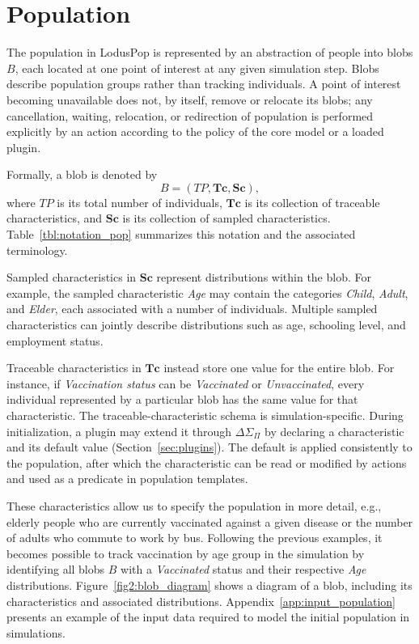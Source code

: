 \FloatBarrier

\section{Population}
\label{sec:population}

\begingroup\color{red}
The population in LodusPop is represented by an abstraction of people into blobs $B$, each located at one point of interest at any given simulation step. Blobs describe population groups rather than tracking individuals. A point of interest becoming unavailable does not, by itself, remove or relocate its blobs; any cancellation, waiting, relocation, or redirection of population is performed explicitly by an action according to the policy of the core model or a loaded plugin.

Formally, a blob is denoted by
\begin{equation}
B=(TP,\bm{Tc},\bm{Sc}),
\label{eq:blob_definition}
\end{equation}
where $TP$ is its total number of individuals, $\bm{Tc}$ is its collection of traceable characteristics, and $\bm{Sc}$ is its collection of sampled characteristics. Table~\ref{tbl:notation_pop} summarizes this notation and the associated terminology.

Sampled characteristics in $\bm{Sc}$ represent distributions within the blob. For example, the sampled characteristic \textit{Age} may contain the categories \textit{Child}, \textit{Adult}, and \textit{Elder}, each associated with a number of individuals. Multiple sampled characteristics can jointly describe distributions such as age, schooling level, and employment status.

Traceable characteristics in $\bm{Tc}$ instead store one value for the entire blob. For instance, if \textit{Vaccination status} can be \textit{Vaccinated} or \textit{Unvaccinated}, every individual represented by a particular blob has the same value for that characteristic. The traceable-characteristic schema is simulation-specific. 
During initialization, a plugin may extend it through $\Delta\Sigma_{\Pi}$ by declaring a characteristic and its default value (Section~\ref{sec:plugins}). The default is applied consistently to the population, after which the characteristic can be read or modified by actions and used as a predicate in population templates.
\endgroup

These characteristics allow us to specify the population in more detail, e.g., elderly people who are currently vaccinated against a given disease or the number of adults who commute to work by bus. Following the previous examples, it becomes possible to track vaccination by age group in the simulation by identifying all blobs $B$ with a \textit{Vaccinated} status and their respective \textit{Age} distributions. Figure~\ref{fig2:blob_diagram} shows a diagram of a blob, including its characteristics and associated distributions. Appendix~\ref{app:input_population} presents an example of the input data required to model the initial population in simulations.


